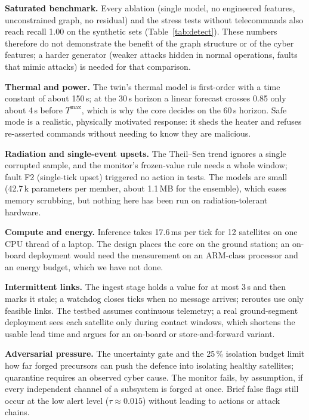 \documentclass[conference]{IEEEtran}
\begin{document}
\textbf{Saturated benchmark.} Every ablation (single model, no engineered features, unconstrained graph,
no residual) and the stress tests without telecommands also reach recall 1.00 on the synthetic sets
(Table~\ref{tab:detect}). These numbers therefore do not demonstrate the benefit of the graph structure or
of the cyber features; a harder generator (weaker attacks hidden in normal operations, faults that mimic
attacks) is needed for that comparison.

\textbf{Thermal and power.} The twin's thermal model is first-order with a time constant of about
150\,s; at the 30\,s horizon a linear forecast crosses 0.85 only about 4\,s before $T^{\max}$, which is
why the core decides on the 60\,s horizon. Safe mode is a realistic, physically motivated response:
it sheds the heater and refuses re-asserted commands without needing to know they are malicious.

\textbf{Radiation and single-event upsets.} The Theil--Sen trend ignores a single corrupted sample, and
the monitor's frozen-value rule needs a whole window; fault F2 (single-tick upset) triggered no action
in tests. The models are small (42.7\,k parameters per member, about 1.1\,MB for the ensemble), which
eases memory scrubbing, but nothing here has been run on radiation-tolerant hardware.

\textbf{Compute and energy.} Inference takes 17.6\,ms per tick for 12 satellites on one CPU thread of a
laptop. The design places the core on the ground station; an on-board deployment would need the
measurement on an ARM-class processor and an energy budget, which we have not done.

\textbf{Intermittent links.} The ingest stage holds a value for at most 3\,s and then marks it stale;
a watchdog closes ticks when no message arrives; reroutes use only feasible links. The testbed assumes
continuous telemetry; a real ground-segment deployment sees each satellite only during contact windows,
which shortens the usable lead time and argues for an on-board or store-and-forward variant.

\textbf{Adversarial pressure.} The uncertainty gate and the 25\,\% isolation budget limit how far
forged precursors can push the defence into isolating healthy satellites; quarantine requires an
observed cyber cause. The monitor fails, by assumption, if every independent channel of a subsystem is
forged at once. Brief false flags still occur at the low alert level ($\tau\approx 0.015$) without
leading to actions or attack chains.
\end{document}

